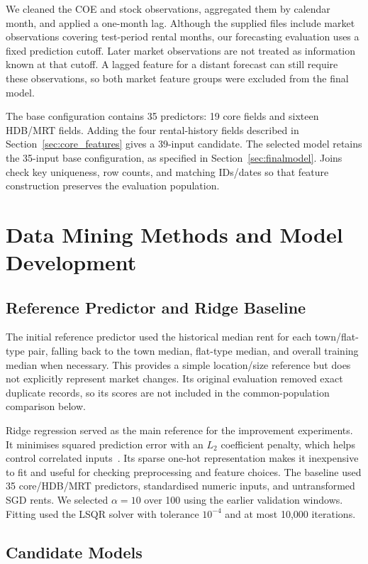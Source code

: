 \documentclass[conference]{IEEEtran}
\begin{document}
We cleaned the COE and stock observations, aggregated them by calendar month,
and applied a one-month lag. Although the supplied files include market
observations covering test-period rental months, our forecasting evaluation
uses a fixed prediction cutoff. Later market observations are not treated
as information known at that cutoff. A lagged feature for a distant forecast
can still require these observations, so both market feature groups were
excluded from the final model.

The base configuration contains 35 predictors: 19 core fields and sixteen
HDB/MRT fields. Adding the four rental-history fields described in
Section~\ref{sec:core_features} gives a 39-input candidate. The selected model
retains the 35-input base configuration, as specified in
Section~\ref{sec:finalmodel}. Joins check key uniqueness, row counts, and
matching IDs/dates so that feature construction preserves the evaluation
population.

\section{Data Mining Methods and Model Development}
\label{sec:methods}

\subsection{Reference Predictor and Ridge Baseline}
The initial reference predictor used the historical median rent
for each town/flat-type pair, falling back to the town median, flat-type
median, and overall training median when necessary. This provides a simple
location/size reference but does not explicitly represent market changes.
Its original evaluation removed exact duplicate records, so its scores are
not included in the common-population comparison below.

Ridge regression served as the main reference for the improvement experiments.
It minimises squared prediction error with an $L_2$ coefficient penalty,
which helps control correlated inputs~\cite{ridge_reference}. Its sparse
one-hot representation makes it inexpensive to fit and useful for checking
preprocessing and feature choices. The baseline used 35 core/HDB/MRT
predictors, standardised numeric inputs, and untransformed SGD rents. We
selected $\alpha=10$ over 100 using the earlier validation windows. Fitting
used the LSQR solver with tolerance $10^{-4}$ and at most 10,000 iterations.

\subsection{Candidate Models}
\end{document}
